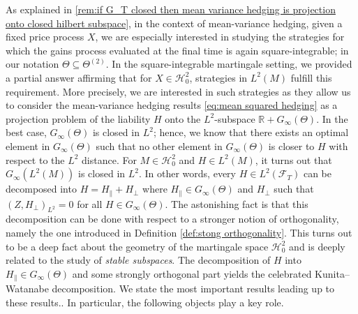 \documentclass[11pt,a4paper,twoside,openany]{report}
\numberwithin{equation}{section}
\theoremstyle{plain} %
\theoremstyle{definition} %
\theoremstyle{remark} %
\begin{document}
As explained in \cref{rem:if G_T closed then mean variance hedging is projection onto closed hilbert subspace}, in the context of mean-variance hedging, given a fixed price process \(X\), we are especially interested in studying the strategies for which the gains process evaluated at the final time is again square-integrable; in our notation \(\Theta\subseteq\Theta^{(2)}\). In the square-integrable martingale setting, we provided a partial answer affirming that for \(X\in\mathcal{H}^2_0\), strategies in \(L^2(M)\) fulfill this requirement. More precisely, we are interested in such strategies as they allow us to consider the mean-variance hedging results \eqref{eq:mean squared hedging} as a projection problem of the liability \(H\) onto the \(L^2\)-subspace \(\mathbb{R}+G_\infty(\Theta)\). In the best case, \(G_\infty(\Theta)\) is closed in \(L^2\); hence, we know that there exists an optimal element in \(G_{\infty}(\Theta)\) such that no other element in \(G_{\infty}(\Theta)\) is closer to \(H\) with respect to the \(L^2\) distance. For \(M\in\mathcal{H}^2_0\) and \(H\in L^2(M)\), it turns out that \(G_{\infty}(L^2(M))\) is closed in \(L^2\). In other words, every \(H\in L^2(\mathcal{F}_T)\) can be decomposed into \(H=H_{\parallel}+H_{\perp}\) where \(H_{\parallel}\in G_{\infty}(\Theta)\) and  \(H_{\perp}\) such that \((Z,H_{\perp})_{L^2}=0\) for all \(H\in G_\infty(\Theta)\). The astonishing fact is that this decomposition can be done with respect to a stronger notion of orthogonality, namely the one introduced in Definition \ref{def:stong orthogonality}. This turns out to be a deep fact about the geometry of the martingale space \(\mathcal{H}^2_0\) and is deeply related to the study of \textit{stable subspaces}. The decomposition of \(H\) into \(H_{\parallel}\in G_{\infty}(\Theta)\) and some strongly orthogonal part yields the celebrated Kunita–Watanabe decomposition. We state the most important results leading up to these results.. In particular, the following objects play a key role.
\end{document}

